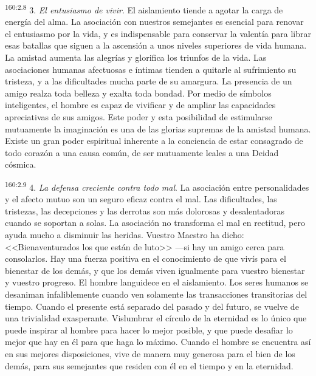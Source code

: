 \par 
\textsuperscript{160:2.8} 3. \textit{El entusiasmo de vivir}. El aislamiento tiende a agotar la carga de energía del alma. La asociación con nuestros semejantes es esencial para renovar el entusiasmo por la vida, y es indispensable para conservar la valentía para librar esas batallas que siguen a la ascensión a unos niveles superiores de vida humana. La amistad aumenta las alegrías y glorifica los triunfos de la vida. Las asociaciones humanas afectuosas e íntimas tienden a quitarle al sufrimiento su tristeza, y a las dificultades mucha parte de su amargura. La presencia de un amigo realza toda belleza y exalta toda bondad. Por medio de símbolos inteligentes, el hombre es capaz de vivificar y de ampliar las capacidades apreciativas de sus amigos. Este poder y esta posibilidad de estimularse mutuamente la imaginación es una de las glorias supremas de la amistad humana. Existe un gran poder espiritual inherente a la conciencia de estar consagrado de todo corazón a una causa común, de ser mutuamente leales a una Deidad cósmica.

\par 
\textsuperscript{160:2.9} 4. \textit{La defensa creciente contra todo mal}. La asociación entre personalidades y el afecto mutuo son un seguro eficaz contra el mal. Las dificultades, las tristezas, las decepciones y las derrotas son más dolorosas y desalentadoras cuando se soportan a solas. La asociación no transforma el mal en rectitud, pero ayuda mucho a disminuir las heridas. Vuestro Maestro ha dicho: <<Bienaventurados los que están de luto>> ---si hay un amigo cerca para consolarlos. Hay una fuerza positiva en el conocimiento de que vivís para el bienestar de los demás, y que los demás viven igualmente para vuestro bienestar y vuestro progreso. El hombre languidece en el aislamiento. Los seres humanos se desaniman infaliblemente cuando ven solamente las transacciones transitorias del tiempo. Cuando el presente está separado del pasado y del futuro, se vuelve de una trivialidad exasperante. Vislumbrar el círculo de la eternidad es lo único que puede inspirar al hombre para hacer lo mejor posible, y que puede desafiar lo mejor que hay en él para que haga lo máximo. Cuando el hombre se encuentra así en sus mejores disposiciones, vive de manera muy generosa para el bien de los demás, para sus semejantes que residen con él en el tiempo y en la eternidad.

